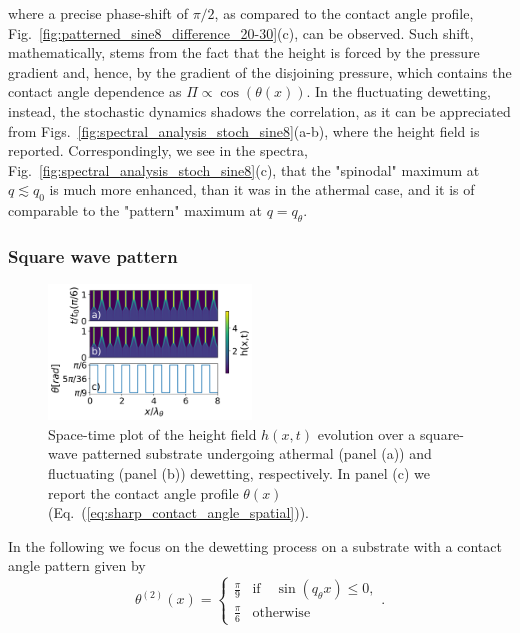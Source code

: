 where a precise phase-shift of $\pi/2$, as compared to the contact angle profile,  Fig.~\ref{fig:patterned_sine8_difference_20-30}(c), can be observed. Such
shift, mathematically, stems from the fact that the height is forced by the pressure gradient and, hence, by the gradient of the disjoining pressure, which contains the contact angle dependence as $\Pi \propto \cos(\theta(x))$.
In the fluctuating dewetting, instead, the stochastic dynamics shadows the correlation,
as it can be appreciated from Figs.~\ref{fig:spectral_analysis_stoch_sine8}(a-b), where 
the height field is reported. 
Correspondingly, we see in the spectra, Fig.~\ref{fig:spectral_analysis_stoch_sine8}(c), 
that the "spinodal" maximum at $q \lesssim q_0$ is much more enhanced, than it was in the athermal case, and it is of comparable to the "pattern" maximum at $q = q_{\theta}$.
\subsubsection{Square wave pattern}\label{subsubsec:square_wave}
\begin{figure}
    \centering
    \includegraphics[width=0.48\textwidth]{graphics/spacedepCA_['delta', '1e7', '10', 25, '9_3', 2000000.0]_v2.png}
    \caption{Space-time plot of the height field $h(x,t)$ evolution over a square-wave patterned substrate undergoing athermal 
    (panel (a)) and fluctuating (panel (b)) dewetting, respectively. In panel (c) we report the contact angle profile $\theta(x)$ (Eq.~(\ref{eq:sharp_contact_angle_spatial})).} 
    \label{fig:patterned_step8_difference_20-30}
\end{figure}
In the following we focus on the dewetting process on a substrate with a contact angle pattern given by 
\begin{equation}\label{eq:sharp_contact_angle_spatial}
    {\theta^{(2)}(x)} = 
    \left\{
    \begin{array}{ll}
        \frac{\pi}{9} & \text{if} \quad\sin(q_{\theta}x) \leq 0, \\
        \frac{\pi}{6} & \text{otherwise}
    \end{array}
    \right..
\end{equation}
